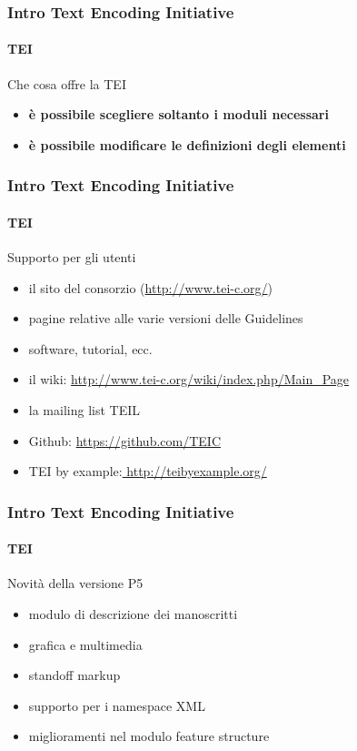 \begin{frame}
	\frametitle{Intro Text Encoding Initiative}
	\framesubtitle{TEI}
	\addtocounter{nframe}{1}

	\begin{block}{Che cosa offre la TEI}
		\begin{itemize}
			\item \textbf{è possibile scegliere soltanto i moduli necessari}
			\item \textbf{è possibile modificare le definizioni degli elementi}
		\end{itemize}

	\end{block}

\end{frame}

\begin{frame}
	\frametitle{Intro Text Encoding Initiative}
	\framesubtitle{TEI}
	\addtocounter{nframe}{1}

	\begin{block}{Supporto per gli utenti}
		\begin{itemize}
			\item il sito del consorzio (\url{http://www.tei-c.org/})
			\item pagine relative alle varie versioni delle Guidelines
			\item software, tutorial, ecc.
			\item il wiki: \url{http://www.tei-c.org/wiki/index.php/Main_Page}
			\item la mailing list TEI\-L
			\item Github: \url{https://github.com/TEIC}
			\item TEI by example:\url{ http://teibyexample.org/}
		\end{itemize}
	\end{block}
\end{frame}


\begin{frame}
	\frametitle{Intro Text Encoding Initiative}
	\framesubtitle{TEI}
	\addtocounter{nframe}{1}

	\begin{block}{Novità della versione P5}
		\begin{itemize}
			\item modulo di descrizione dei manoscritti
			\item grafica e multimedia
			\item standoff markup
			\item supporto per i namespace XML
			\item miglioramenti nel modulo feature structure
		\end{itemize}

	\end{block}

\end{frame}

